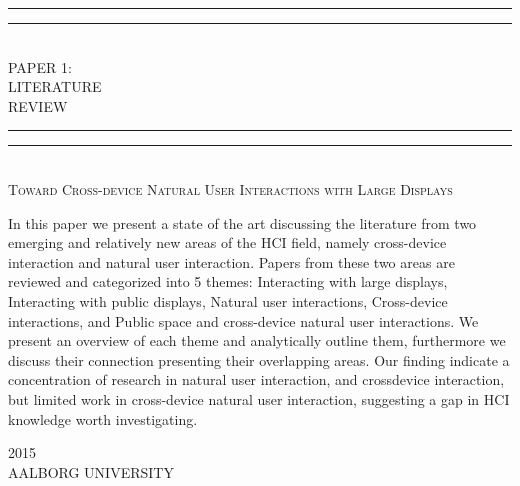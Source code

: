 
\newlength{\drop}


		\textheight
		\centering
		\vspace*{\baselineskip}
		\rule{\textwidth}{1.6pt}\vspace*{-\baselineskip}\vspace*{2pt}
		\rule{\textwidth}{0.4pt}\\[\baselineskip]
		{\LARGE PAPER 1: \\ LITERATURE \\[0.3\baselineskip] REVIEW}\\[0.2\baselineskip]
		\rule{\textwidth}{0.4pt}\vspace*{-\baselineskip}\vspace{3.2pt}
		\rule{\textwidth}{1.6pt}\\[\baselineskip]
		\scshape
		{ \large Toward Cross-device Natural User Interactions with Large Displays } \par
		\vspace*{2\baselineskip}
		\vspace*{2\baselineskip}
		\vspace*{2\baselineskip}
		\vspace*{2\baselineskip}
{\justify
	\small In this paper we present a state of the art discussing the literature from two emerging and relatively new areas of the HCI ﬁeld, namely cross-device interaction and natural user interaction. Papers from these two areas are reviewed and categorized into 5 themes: Interacting with large displays, Interacting with public displays, Natural user interactions, Cross-device interactions, and Public space and cross-device natural user interactions. We present an overview of each theme and analytically outline them, furthermore we discuss their connection presenting their overlapping areas. Our ﬁnding indicate a concentration of research in natural user interaction, and crossdevice interaction, but limited work in cross-device natural user interaction, suggesting a gap in HCI knowledge worth investigating.}\par
		\vfill
		{\scshape 2015} \\
		{\large AALBORG UNIVERSITY}\par
	
